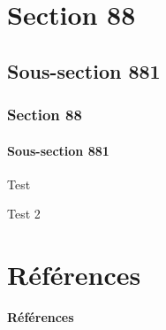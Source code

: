 \documentclass[11pt]{beamer}
\begin{document}
\section{Section 88}

\subsection{Sous-section 881}
\begin{frame}
\frametitle{Section 88}
\framesubtitle{Sous-section 881}

Test

Test 2


\end{frame}


\section{Références}

\begin{frame}[allowframebreaks]{\textbf{Références}}


\end{frame}
\end{document}
